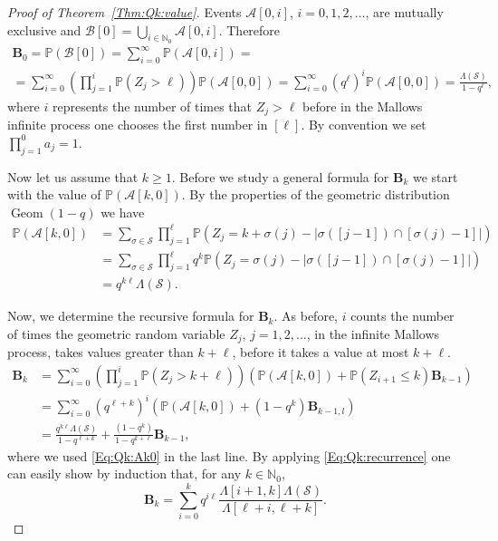 \documentclass[letterpaper,11pt]{article}
\theoremstyle{definition}
\theoremstyle{remark}
\renewcommand{\le}{\leqslant}
\renewcommand{\ge}{\geqslant}
\newcommand{\bN}{\mathbb{N}}
\newcommand{\product}{\Lambda}
\newcommand{\productO}{\Lambda(\cS)}
\newcommand{\Pra}[1]{\mathbb{P}\left(#1\right)}
\newcommand{\bB}{\mathbf{B}}
\newcommand{\cA}{\mathcal{A}}
\newcommand{\cB}{\mathcal{B}}
\newcommand{\NN}{\mathbb{N}}
\newcommand{\cS}{\mathcal{S}}
\begin{document}
\begin{proof}[Proof of Theorem~\ref{Thm:Qk:value}]
	
	Events $\cA[0,i]$, $i=0,1,2,\ldots$, are mutually exclusive and $\cB[0]=\bigcup_{i\in \NN_0}\cA[0,i]$. Therefore
	\begin{multline}\label{Eq:Q0}
		\bB_{0}=\Pra{\cB[0]}=\sum_{i=0}^{\infty}\Pra{\cA[0,i]}=\\=\sum_{i=0}^{\infty}\left(\prod_{j=1}^{i}\Pra{Z_j>\ell}\right)\Pra{\cA[0,0]}
		=\sum_{i=0}^{\infty}(q^\ell)^i\Pra{\cA[0,0]}=\frac{\productO}{1-q^\ell},
	\end{multline}
	where $i$ represents the number of times that $Z_j>\ell$ before in the Mallows infinite process one chooses the first number in $[\ell]$. By convention we set $\prod_{j=1}^0a_j=1$.
	
	Now let us assume that $k\ge 1$.
	Before we study a general formula for $\bB_{k}$ we start with the value of $\Pra{\cA[k,0]}$. By the properties of the geometric distribution $\operatorname{Geom}(1-q)$ we have 
	\begin{equation}\label{Eq:Qk:Ak0}
		\begin{split}
			\Pra{\cA[k,0]}
			&=\sum_{\sigma\in \cS}\prod_{j=1}^{\ell}\Pra{Z_j=k+\sigma(j)-|\sigma([j-1])\cap [\sigma(j)-1]|}\\
			&=\sum_{\sigma\in \cS}\prod_{j=1}^{\ell}q^k\Pra{Z_j=\sigma(j)-|\sigma([j-1])\cap [\sigma(j)-1]|}\\
			&=q^{k\ell}\productO.
		\end{split}
	\end{equation}
	
	Now, we determine the recursive formula for $\bB_{k}$. As before, $i$ counts the number of times the geometric random variable $Z_j$, $j=1,2,\ldots$, in the infinite Mallows process, takes values greater than $k+\ell$, before it takes a value at most $k+\ell$.
	\begin{align}\nonumber
		\bB_{k}
		&=\sum_{i=0}^{\infty}\left(\prod_{j=1}^{i}\Pra{Z_j>k+\ell}\right)\left(\Pra{\cA[k,0]}+\Pra{Z_{i+1}\le k}\bB_{k-1}\right)\\
		\nonumber
		&=\sum_{i=0}^{\infty}(q^{\ell+k})^i\left(\Pra{\cA[k,0]}+(1-q^k)\bB_{k-1,l}\right)\\
		\label{Eq:Qk:recurrence}
		&=\frac{q^{k\ell}\productO}{1-q^{\ell+k}}+\frac{(1-q^k)}{1-q^{k+\ell}}\bB_{k-1},
	\end{align} 
	where we used \eqref{Eq:Qk:Ak0} in the last line.
	By applying \eqref{Eq:Qk:recurrence} one can easily show by induction that, for any $k\in \bN_0$,
	\begin{equation}\label{Eq:Qk:Sum0}
		\bB_{k}=\sum_{i=0}^k q^{i\ell}\frac{\product[i+1,k]\productO}{\product[\ell+i,\ell+k]}.
	\end{equation}
	

\end{proof}
\end{document}
